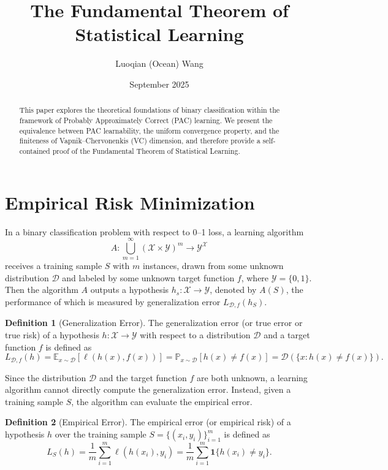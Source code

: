 \documentclass[openany, amssymb, psamsfonts]{amsart}
\title{The Fundamental Theorem of Statistical Learning}
\author{Luoqian (Ocean) Wang}
\date{September 2025}
\theoremstyle{definition}
\newtheorem{defn}{Definition}[section]
\numberwithin{equation}{section}
\begin{document}
\begin{abstract}
This paper explores the theoretical foundations of binary classification within the framework of Probably Approximately Correct (PAC) learning. We present the equivalence between PAC learnability, the uniform convergence property, and the finiteness of Vapnik--Chervonenkis (VC) dimension, and therefore provide a self-contained proof of the Fundamental Theorem of Statistical Learning.
\end{abstract}

\maketitle

\tableofcontents

\section{Empirical Risk Minimization}

In a binary classification problem with respect to 0--1 loss, a learning algorithm 
\[A\colon \bigcup_{m=1}^{\infty}{(\mathcal{X} \times \mathcal{Y})^m \to \mathcal{Y}^{\mathcal{X}}}\]
receives a training sample $S$ with $m$ instances, drawn from some unknown distribution $\mathcal{D}$ and labeled by some unknown target function $f$, where $\mathcal{Y} = \{0,1\}$. Then the algorithm  $A$ outputs a hypothesis $h_{s}$$\colon \mathcal{X} \to \mathcal{Y}$, denoted by $A(S)$, the performance of which is measured by generalization error $L_{\mathcal{D},f}(h_{S})$.

\begin{defn}[Generalization Error]\label{definition: generalization error}
The generalization error (or true error or true risk) of a hypothesis $h \colon \mathcal{X} \to \mathcal{Y}$ with respect to a distribution $\mathcal{D}$ and a target function $f$ is defined as 
\[L_{\mathcal{D},f}(h) = \mathbb{E}_{x \sim \mathcal{D}}[\ell(h(x), f(x))] = \mathbb{P}_{x \sim \mathcal{D}}[h(x) \neq f(x)] = \mathcal{D}(\{x \colon h(x) \neq f(x)\}).\]
\end{defn}

Since the distribution $\mathcal D$ and the target function $f$ are both unknown, a learning algorithm cannot directly compute the generalization error. Instead, given a training sample $S$, the algorithm can evaluate the empirical error.

\begin{defn}[Empirical Error]\label{definition: empirical error}
The empirical error (or empirical risk) of a hypothesis $h$ over the training sample $S=\{(x_i,y_i)\}_{i=1}^m$ is defined as 
\[L_S(h) = \frac{1}{m}\sum_{i=1}^m \ell(h(x_i),y_i) = \frac{1}{m}\sum_{i=1}^m \mathbf{1}\{h(x_i) \neq y_i\}.\]
\end{defn}
\end{document}
